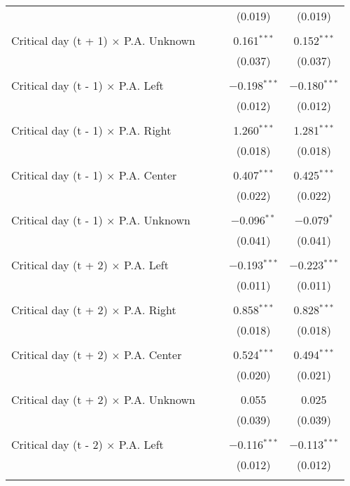 \documentclass[
]{article}
\begin{document}
\begin{table}[!htbp]
{\begin{tabular}{@{\extracolsep{5pt}}lcccc}
  &  &  & (0.019) & (0.019) \\ 
  & & & & \\ 
 Critical day (t + 1) $\times$ P.A. Unknown &  &  & 0.161$^{***}$ & 0.152$^{***}$ \\ 
  &  &  & (0.037) & (0.037) \\ 
  & & & & \\ 
 Critical day (t - 1) $\times$ P.A. Left &  &  & $-$0.198$^{***}$ & $-$0.180$^{***}$ \\ 
  &  &  & (0.012) & (0.012) \\ 
  & & & & \\ 
 Critical day (t - 1) $\times$ P.A. Right &  &  & 1.260$^{***}$ & 1.281$^{***}$ \\ 
  &  &  & (0.018) & (0.018) \\ 
  & & & & \\ 
 Critical day (t - 1) $\times$ P.A. Center &  &  & 0.407$^{***}$ & 0.425$^{***}$ \\ 
  &  &  & (0.022) & (0.022) \\ 
  & & & & \\ 
 Critical day (t - 1) $\times$ P.A. Unknown &  &  & $-$0.096$^{**}$ & $-$0.079$^{*}$ \\ 
  &  &  & (0.041) & (0.041) \\ 
  & & & & \\ 
 Critical day (t + 2) $\times$ P.A. Left &  &  & $-$0.193$^{***}$ & $-$0.223$^{***}$ \\ 
  &  &  & (0.011) & (0.011) \\ 
  & & & & \\ 
 Critical day (t + 2) $\times$ P.A. Right &  &  & 0.858$^{***}$ & 0.828$^{***}$ \\ 
  &  &  & (0.018) & (0.018) \\ 
  & & & & \\ 
 Critical day (t + 2) $\times$ P.A. Center &  &  & 0.524$^{***}$ & 0.494$^{***}$ \\ 
  &  &  & (0.020) & (0.021) \\ 
  & & & & \\ 
 Critical day (t + 2) $\times$ P.A. Unknown &  &  & 0.055 & 0.025 \\ 
  &  &  & (0.039) & (0.039) \\ 
  & & & & \\ 
 Critical day (t - 2) $\times$ P.A. Left &  &  & $-$0.116$^{***}$ & $-$0.113$^{***}$ \\ 
  &  &  & (0.012) & (0.012) \\ 
  & & & & \\ 

\end{tabular}}
\end{table}
\end{document}
